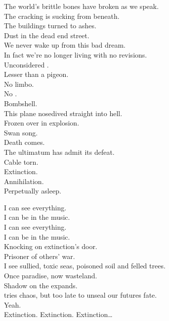 The world's brittle bones have broken as we speak. \\
The cracking  is sucking from beneath. \\
The buildings turned to ashes. \\
Dust in the dead end street. \\
We never wake up from this bad dream. \\

In fact we're no longer living with no revisions. \\
Unconsidered . \\
Lesser than a pigeon. \\
No limbo. \\
No . \\
Bombshell. \\
This plane nosedived straight into hell. \\
Frozen over in explosion. \\

Swan song. \\
Death comes. \\
The ultimatum has admit its defeat. \\
Cable torn. \\
Extinction. \\
Annihilation. \\
Perpetually asleep. \\



I can see everything. \\
I can be in the music. \\
I can see everything. \\
I can be in the music. \\

Knocking on extinction's door. \\
Prisoner of others' war. \\
I see sullied, toxic seas, poisoned soil and felled trees. \\
Once paradise, now wasteland. \\
Shadow on the  expands. \\
 tries chaos, but too late to unseal our futures fate. \\
Yeah. \\

Extinction. Extinction. Extinction… \\

